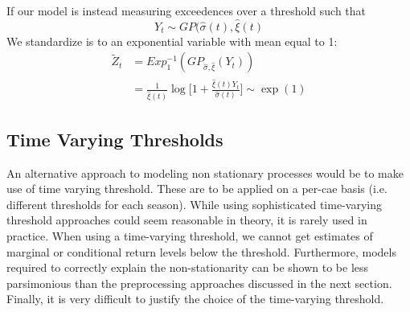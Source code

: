 \documentclass{article}
\theoremstyle{definition}
\theoremstyle{definition}
\begin{document}
If our model is instead measuring exceedences over a threshold such that
\[Y_t\sim GP(\hat\sigma(t),\hat\xi(t)\]
We standardize is to an exponential variable with
mean equal to 1:
\begin{align*}
    \tilde{Z}_t&= Exp^{-1}_1(GP_{\hat\sigma, \hat\xi}(Y_t))\\
    &=\frac{1}{\hat\xi(t)}\log\bigg[1 +\frac{\hat\xi(t)Y_t}{\hat\sigma(t)} \bigg] \sim \exp(1)
\end{align*}
\subsection{Time Varying Thresholds}
An alternative approach to modeling non stationary processes would be to make use of time varying threshold. These are to be applied on a per-cae basis (i.e. different thresholds for each season). While using sophisticated time-varying threshold approaches could seem reasonable in theory, it is rarely used in practice. When using a time-varying threshold, we cannot get estimates of marginal or conditional return levels below the threshold. Furthermore, models required to correctly explain the
non-stationarity can be shown to be less parsimonious than the preprocessing approaches discussed in the next section. Finally, it is very difficult to justify the choice of the time-varying threshold.
\end{document}
